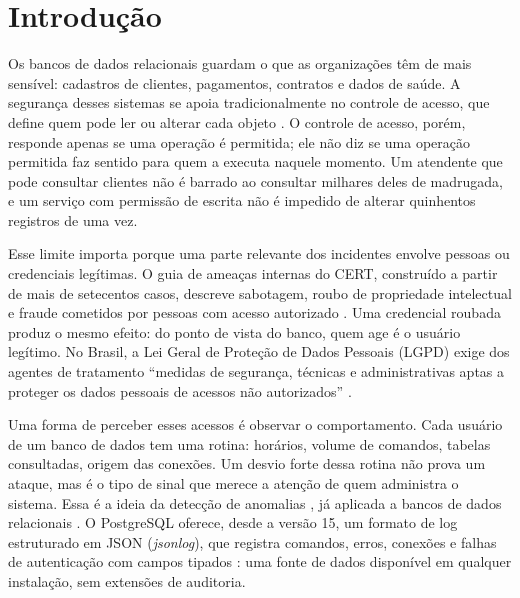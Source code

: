 
\section{Introdução}
\label{sec:introducao}

Os bancos de dados relacionais guardam o que as organizações têm de mais sensível: cadastros
de clientes, pagamentos, contratos e dados de saúde. A segurança desses sistemas se apoia
tradicionalmente no controle de acesso, que define quem pode ler ou alterar cada objeto
\cite{bertino2005}. O controle de acesso, porém, responde apenas se uma operação é permitida;
ele não diz se uma operação permitida faz sentido para quem a executa naquele momento. Um
atendente que pode consultar clientes não é barrado ao consultar milhares deles de madrugada,
e um serviço com permissão de escrita não é impedido de alterar quinhentos registros de uma vez.

Esse limite importa porque uma parte relevante dos incidentes envolve pessoas ou credenciais
legítimas. O guia de ameaças internas do CERT, construído a partir de mais de setecentos casos,
descreve sabotagem, roubo de propriedade intelectual e fraude cometidos por pessoas com acesso
autorizado \cite{cappelli2012}. Uma credencial roubada produz o mesmo efeito: do ponto de vista
do banco, quem age é o usuário legítimo. No Brasil, a Lei Geral de Proteção de Dados Pessoais (LGPD)
exige dos agentes de tratamento ``medidas de segurança, técnicas e administrativas aptas a
proteger os dados pessoais de acessos não autorizados'' \cite[art.~46]{brasil2018}.

Uma forma de perceber esses acessos é observar o comportamento. Cada usuário de um banco de
dados tem uma rotina: horários, volume de comandos, tabelas consultadas, origem das conexões.
Um desvio forte dessa rotina não prova um ataque, mas é o tipo de sinal que merece a atenção de
quem administra o sistema. Essa é a ideia da detecção de anomalias \cite{chandola2009}, já
aplicada a bancos de dados relacionais \cite{kamra2008,sallam2017}. O PostgreSQL oferece, desde
a versão 15, um formato de log estruturado em JSON (\textit{jsonlog}), que registra comandos,
erros, conexões e falhas de autenticação com campos tipados \cite{postgresql2025a}: uma fonte de
dados disponível em qualquer instalação, sem extensões de auditoria.

